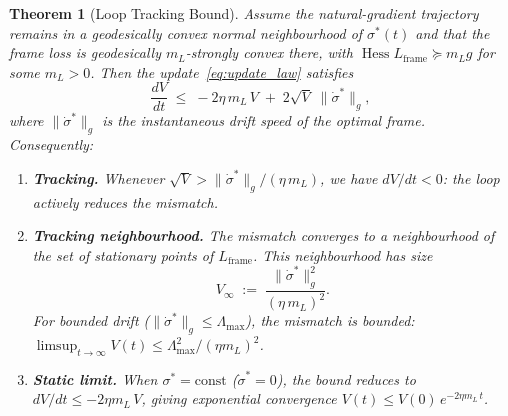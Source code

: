 \documentclass[12pt]{article}
\newtheorem{theorem}{Theorem}
\begin{document}
\begin{theorem}[Loop Tracking Bound]
\label{thm:loop_stability}
Assume the natural-gradient trajectory remains in a geodesically convex
normal neighbourhood of $\sigma^*(t)$ and that the frame loss is
geodesically $m_L$-strongly convex there, with
$\operatorname{Hess}L_{\mathrm{frame}}\succeq m_L g$ for some
$m_L>0$.  Then the update~\eqref{eq:update_law} satisfies
\begin{equation}
\label{eq:lyapunov_decrease}
\frac{dV}{dt}
\;\leq\; -2\eta\,m_L\,V
\;+\; 2\sqrt{V}\;\bigl\|\dot{\sigma}^*\bigr\|_g,
\end{equation}
where $\|\dot{\sigma}^*\|_g$ is the instantaneous drift speed
of the optimal frame.
Consequently:
\begin{enumerate}
\item[\textup{(a)}] \textbf{Tracking.}
  Whenever $\sqrt{V} >
  \|\dot{\sigma}^*\|_g / (\eta\,m_L)$,
  we have $dV/dt < 0$: the loop actively reduces the
  mismatch.
\item[\textup{(b)}] \textbf{Tracking neighbourhood.}
  The mismatch converges to a neighbourhood of the set
  of stationary points of $L_{\mathrm{frame}}$.
  This neighbourhood has size
  \begin{equation}
  \label{eq:tracking_neighbourhood}
  V_\infty
  \;:=\; \frac{\bigl\|\dot{\sigma}^*\bigr\|_g^2}
  {(\eta\,m_L)^2}.
  \end{equation}
  For bounded drift
  ($\|\dot{\sigma}^*\|_g \leq \Lambda_{\max}$), the
  mismatch is bounded:
  $\limsup_{t\to\infty} V(t)
  \leq \Lambda_{\max}^2/(\eta m_L)^2$.
\item[\textup{(c)}] \textbf{Static limit.}
  When $\sigma^* = \mathrm{const}$
  ($\dot{\sigma}^* = 0$), the bound reduces to
  $dV/dt \leq -2\eta m_L\,V$,
  giving exponential convergence
  $V(t) \leq V(0)\,e^{-2\eta m_L\,t}$.
\end{enumerate}
\end{theorem}
\end{document}
